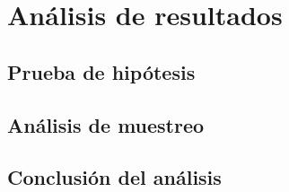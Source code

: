 
\chapter{Análisis de resultados}
\section{Prueba de hipótesis}

\section{Análisis de muestreo}
\section{Conclusión del análisis}
